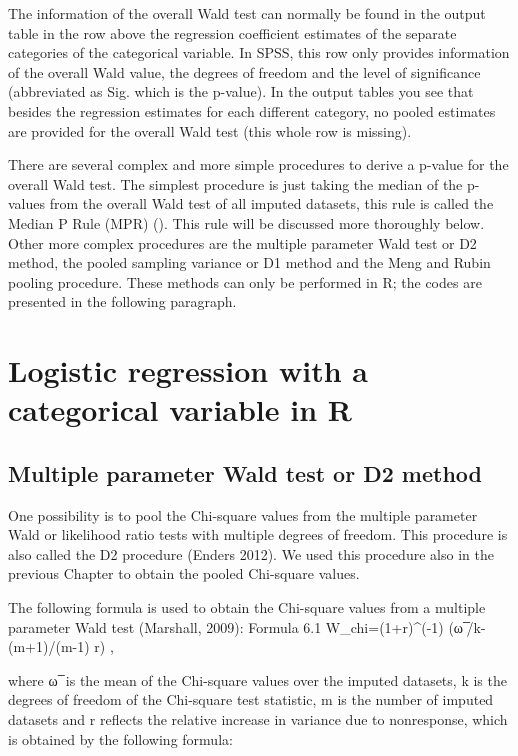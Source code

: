 \documentclass[]{book}
\begin{document}
The information of the overall Wald test can normally be found in the
output table in the row above the regression coefficient estimates of
the separate categories of the categorical variable. In SPSS, this row
only provides information of the overall Wald value, the degrees of
freedom and the level of significance (abbreviated as Sig. which is the
p-value). In the output tables you see that besides the regression
estimates for each different category, no pooled estimates are provided
for the overall Wald test (this whole row is missing).

There are several complex and more simple procedures to derive a p-value
for the overall Wald test. The simplest procedure is just taking the
median of the p-values from the overall Wald test of all imputed
datasets, this rule is called the Median P Rule (MPR)
(\citet{eekhout3}). This rule will be discussed more thoroughly below.
Other more complex procedures are the multiple parameter Wald test or D2
method, the pooled sampling variance or D1 method and the Meng and Rubin
pooling procedure. These methods can only be performed in R; the codes
are presented in the following paragraph.

\section{Logistic regression with a categorical variable in
R}\label{logistic-regression-with-a-categorical-variable-in-r}

\subsection{Multiple parameter Wald test or D2
method}\label{multiple-parameter-wald-test-or-d2-method}

One possibility is to pool the Chi-square values from the multiple
parameter Wald or likelihood ratio tests with multiple degrees of
freedom. This procedure is also called the D2 procedure (Enders 2012).
We used this procedure also in the previous Chapter to obtain the pooled
Chi-square values.

The following formula is used to obtain the Chi-square values from a
multiple parameter Wald test (Marshall, 2009): Formula 6.1
W\_chi=(1+r)\^{}(-1) (ω ̅/k-(m+1)/(m-1) r) ,

where ω ̅ is the mean of the Chi-square values over the imputed datasets,
k is the degrees of freedom of the Chi-square test statistic, m is the
number of imputed datasets and r reflects the relative increase in
variance due to nonresponse, which is obtained by the following formula:
\end{document}
